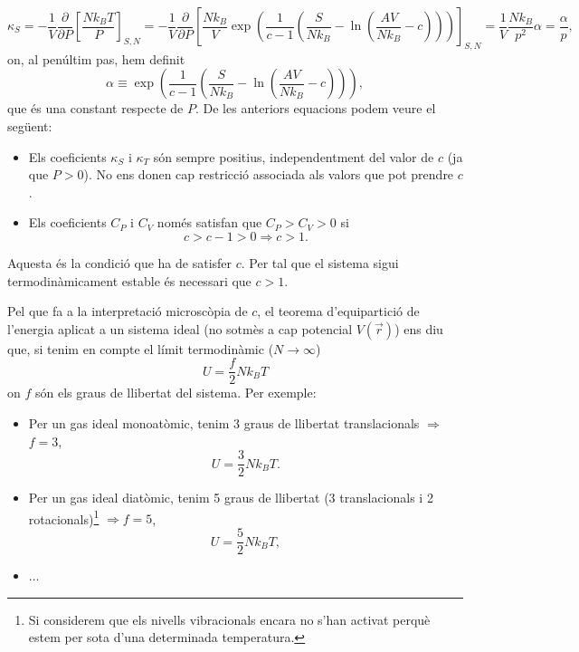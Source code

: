 \documentclass[a4paper, 10pt]{article}
\begin{document}
\begin{equation*}
	\kappa_S = -\frac{1}{V}\frac{\partial}{\partial P}\left[\frac{Nk_BT}{P}\right]_{S,N} = -\frac{1}{V}\frac{\partial}{\partial P}\left[\frac{Nk_B}{V}\exp(\frac{1}{c-1}\left(\frac{S}{Nk_B}-\ln\left(\frac{AV}{Nk_B}-c\right)\right))\right]_{S,N} = \frac{1}{V} \frac{Nk_B}{p^2}\alpha = \frac{\alpha}{p},
\end{equation*}
on, al penúltim pas, hem definit
\begin{equation}
	\alpha \equiv \exp(\frac{1}{c-1}\left(\frac{S}{Nk_B}-\ln\left(\frac{AV}{Nk_B}-c\right)\right)),
\end{equation}
que és una constant respecte de $P$. De les anteriors equacions podem veure el següent:
\begin{itemize}
	\item Els coeficients $\kappa_{S}$ i $\kappa_{T}$ són sempre positius, independentment del valor de $c$ (ja que $P>0$). No ens donen cap restricció associada als valors que pot prendre $c$.
	\item Els coeficients $C_P$ i $C_V$ només satisfan que $C_P>C_V>0$ si
	\begin{equation*}
		c > c-1 > 0 \Rightarrow \boxed{c>1}.
	\end{equation*}
\end{itemize}
Aquesta és la condició que ha de satisfer $c$. Per tal que el sistema sigui termodinàmicament estable és necessari que $c>1$.

Pel que fa a la interpretació microscòpia de $c$, el teorema d'equipartició de l'energia aplicat a un sistema ideal (no sotmès  a cap potencial $V(\vec{r})$) ens diu que, si tenim en compte el límit termodinàmic ($N\rightarrow \infty$)
\begin{equation}
	U = \frac{f}{2}Nk_BT \label{eqb5}
\end{equation}
on $f$ són els graus de llibertat del sistema. Per exemple:
\begin{itemize}
	\item Per un gas ideal monoatòmic, tenim 3 graus de llibertat translacionals $\Rightarrow$ $f=3$, 
	\begin{equation}
		U = \frac{3}{2}Nk_BT.
	\end{equation}
	\item Per un gas ideal diatòmic, tenim 5 graus de llibertat (3 translacionals i 2 rotacionals)\footnote{Si considerem que els nivells vibracionals encara no s'han activat perquè estem per sota d'una determinada temperatura.} $\Rightarrow f = 5$,
	\begin{equation}
		U = \frac{5}{2}Nk_BT,
	\end{equation}
	\item $\ldots$
\end{itemize}
\end{document}
